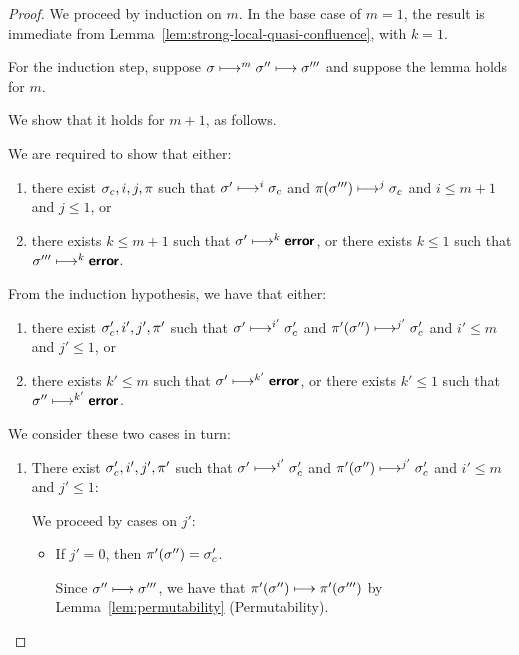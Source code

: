 \begin{proof}
  We proceed by induction on $m$.  In the base case of $m = 1$, the
  result is immediate from
  Lemma~\ref{lem:strong-local-quasi-confluence}, with $k = 1$.

  For the induction step, suppose $\sigma \longmapsto^m \sigma''
  \longmapsto \sigma'''$ and suppose the lemma holds for $m$.

  We show that it holds for $m + 1$, as follows.

  We are required to show that either:
  \begin{enumerate}
    \item there exist $\sigma_c, i, j, \pi$ such that $\sigma'
      \longmapsto^{i} \sigma_c$ and $\pi(\sigma''') \longmapsto^{j}
      \sigma_c$ and $i \leq m + 1$ and $j \leq 1$, or
    \item there exists $k \leq m + 1$ such that $\sigma' \longmapsto^k
      \textbf{\textsf{error}}$, or there exists $k \leq 1$ such that $\sigma'''
      \longmapsto^k \textbf{\textsf{error}}$.
  \end{enumerate}

  From the induction hypothesis, we have that either:
  \begin{enumerate}
    \item there exist $\sigma_c', i', j', \pi'$ such that $\sigma'
      \longmapsto^{i'} \sigma_c'$ and $\pi'(\sigma'') \longmapsto^{j'}
      \sigma_c'$ and $i' \leq m$ and $j' \leq 1$, or
    \item there exists $k' \leq m$ such that $\sigma'
      \longmapsto^{k'} \textbf{\textsf{error}}$, or there exists $k' \leq 1$ such that
      $\sigma'' \longmapsto^{k'} \textbf{\textsf{error}}$.
  \end{enumerate}

  We consider these two cases in turn:
  \begin{enumerate}
    \item There exist $\sigma_c', i', j', \pi'$ such that $\sigma'
      \longmapsto^{i'} \sigma_c'$ and $\pi'(\sigma'') \longmapsto^{j'}
      \sigma_c'$ and $i' \leq m$ and $j' \leq 1$:

      We proceed by cases on $j'$:
      \begin{itemize}

      \item If $j' = 0$, then $\pi'(\sigma'') = \sigma_c'$.

        Since $\sigma'' \longmapsto \sigma'''$, we have that
        $\pi'(\sigma'') \longmapsto \pi'(\sigma''')$ by
        Lemma~\ref{lem:permutability} (Permutability).


\end{itemize}
\end{enumerate}
\end{proof}
